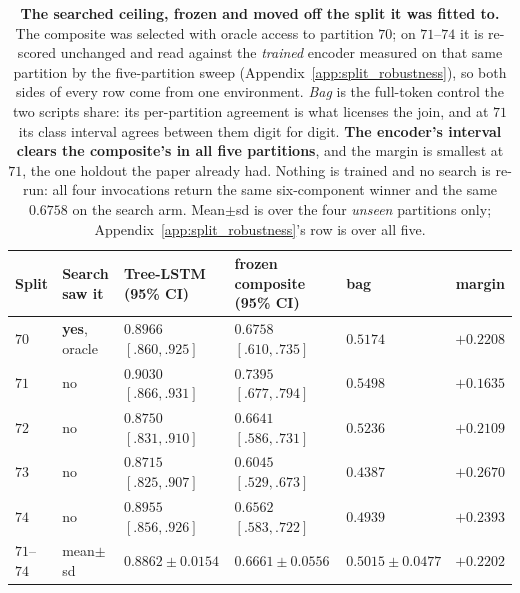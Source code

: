 \begin{table}[t]
\centering
\caption{\textbf{The searched ceiling, frozen and moved off the split it was fitted to.} The composite was selected with oracle access to partition $70$; on $71$--$74$ it is re-scored unchanged and read against the \emph{trained} encoder measured on that same partition by the five-partition sweep (Appendix~\ref{app:split_robustness}), so both sides of every row come from one environment. \emph{Bag} is the full-token control the two scripts share: its per-partition agreement is what licenses the join, and at $71$ its class interval agrees between them digit for digit. \textbf{The encoder's interval clears the composite's in all five partitions}, and the margin is smallest at $71$, the one holdout the paper already had. Nothing is trained and no search is re-run: all four invocations return the same six-component winner and the same $0.6758$ on the search arm. Mean${\pm}$sd is over the four \emph{unseen} partitions only; Appendix~\ref{app:split_robustness}'s row is over all five.}
\label{tab:holdout_ceiling}
\small\setlength{\tabcolsep}{4pt}%
\begin{tabular}{@{}l l l l l r@{}}
\toprule
Split & Search saw it & Tree-LSTM (95\% CI) & frozen composite (95\% CI) & bag & margin \\
\midrule
$70$ & \textbf{yes}, oracle & $0.8966$ $[.860,.925]$ & $0.6758$ $[.610,.735]$ & $0.5174$ & $+0.2208$ \\
$71$ & no & $0.9030$ $[.866,.931]$ & $0.7395$ $[.677,.794]$ & $0.5498$ & $+0.1635$ \\
$72$ & no & $0.8750$ $[.831,.910]$ & $0.6641$ $[.586,.731]$ & $0.5236$ & $+0.2109$ \\
$73$ & no & $0.8715$ $[.825,.907]$ & $0.6045$ $[.529,.673]$ & $0.4387$ & $+0.2670$ \\
$74$ & no & $0.8955$ $[.856,.926]$ & $0.6562$ $[.583,.722]$ & $0.4939$ & $+0.2393$ \\
\midrule
$71$--$74$ & mean${\pm}$sd & $0.8862{\pm}0.0154$ & $0.6661{\pm}0.0556$ & $0.5015{\pm}0.0477$ & $+0.2202$ \\
\bottomrule
\end{tabular}
\end{table}

